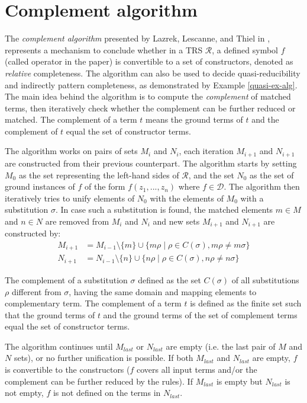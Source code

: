 \section{Complement algorithm} \label{lazrek}
The \textit{complement algorithm} presented by Lazrek, Lescanne, and Thiel in \cite{lazrek}, represents a mechanism to conclude whether in a TRS $\mathcal{R}$, a defined symbol $f$ (called operator in the paper) is convertible to a set of constructors, denoted as \textit{relative} completeness. The algorithm can also be used to decide quasi-reducibility and indirectly pattern completeness, as demonstrated by Example \ref{quasi-ex-alg}. The main idea behind the algorithm is to compute the \textit{complement} of matched terms, then iteratively check whether the complement can be further reduced or matched. The complement of a term $t$ means the ground terms of $t$ and the complement of $t$ equal the set of constructor terms.

The algorithm works on pairs of sets $M_i$ and $N_i$, each iteration $M_{i+1}$ and $N_{i+1}$ are constructed from their previous counterpart. The algorithm starts by setting $M_0$ as the set representing the left-hand sides of $\mathcal{R}$, and the set $N_0$ as the set of ground instances of $f$ of the form $f(z_1, ..., z_n)$ where $f \in \mathcal{D}$. The algorithm then iteratively tries to unify elements of $N_0$ with the elements of $M_0$ with a substitution $\sigma$. In case such a substitution is found, the matched elements $m \in M$ and $n \in N$ are removed from $M_i$ and $N_i$ and new sets $M_{i+1}$ and $N_{i+1}$ are constructed by:
\begin{align*}
    M_{i+1} &= M_{i-1} \setminus \{m\} \cup \{m\rho \mid \rho \in C(\sigma), m\rho \neq m\sigma\} \\
    N_{i+1} &= N_{i-1} \setminus \{n\} \cup \{n\rho \mid \rho \in C(\sigma), n\rho \neq n\sigma\}
\end{align*}

The complement of a substitution $\sigma$ defined as the set $C(\sigma)$ of all substitutions $\rho$ different from $\sigma$, having the same domain and mapping elements to complementary term. The complement of a term $t$ is defined as the finite set such that the ground terms of $t$ and the ground terms of the set of complement terms equal the set of constructor terms.

The algorithm continues until $M_{last}$ or $N_{last}$ are empty (i.e. the last pair of $M$ and $N$ sets), or no further unification is possible. If both $M_{last}$ and $N_{last}$ are empty, $f$ is convertible to the constructors ($f$ covers all input terms and/or the complement can be further reduced by the rules). If $M_{last}$ is empty but $N_{last}$ is not empty, $f$ is not defined on the terms in $N_{last}$.

